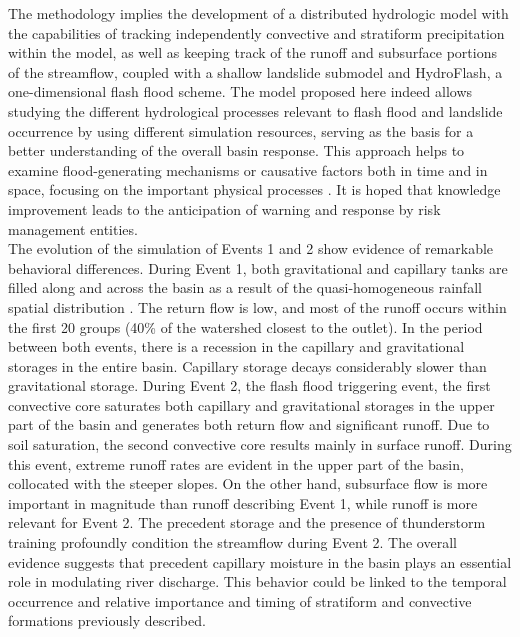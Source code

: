 \documentclass[hess, manuscript]{copernicus}
\begin{document}
The methodology implies the development of a distributed hydrologic model with the capabilities of tracking independently convective and stratiform precipitation within the model, as well as keeping track of the runoff and subsurface portions of the streamflow,  coupled with a shallow landslide submodel and HydroFlash, a one-dimensional flash flood scheme.  The model proposed here indeed allows studying the different hydrological processes relevant to flash flood and landslide occurrence by using different simulation resources, serving as the basis for a better understanding of the overall basin response. This approach helps to examine flood-generating mechanisms or causative factors both in time and in space, focusing on the important physical processes \citep{klemes1993, Merz2003}. It is hoped that knowledge improvement leads to the anticipation of warning and response by risk management entities. \\

The evolution of the simulation of Events 1 and 2 show evidence of remarkable behavioral differences. During Event 1, both gravitational and capillary tanks are filled along and across the basin as a result of the quasi-homogeneous rainfall spatial distribution \citep{Zoccatelli2011}. The return flow is low, and most of the runoff occurs within the first 20 groups (40\% of the watershed closest to the outlet). In the period between both events, there is a recession in the capillary and gravitational storages in the entire basin. Capillary storage decays considerably slower than gravitational storage. During Event 2, the flash flood triggering event, the first convective core saturates both capillary and gravitational storages in the upper part of the basin and generates both return flow and significant runoff. Due to soil saturation, the second convective core results mainly in surface runoff. During this event, extreme runoff rates are evident in the upper part of the basin, collocated with the steeper slopes. On the other hand, subsurface flow is more important in magnitude than runoff describing Event 1, while runoff is more relevant for Event 2. The precedent storage and the presence of thunderstorm training profoundly condition the streamflow during Event 2. The overall evidence suggests that precedent capillary moisture in the basin plays an essential role in modulating river discharge. This behavior could be linked to the temporal occurrence and relative importance and timing of stratiform and convective formations previously described. \\
\end{document}
